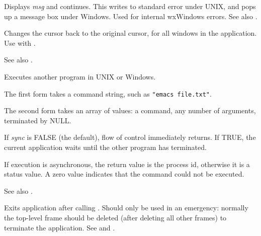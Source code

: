 \label{wxerror}


Displays {\it msg} and continues. This writes to standard error under
UNIX, and pops up a message box under Windows. Used for internal
wxWindows errors. See also .

\label{wxendbusycursor}


Changes the cursor back to the original cursor, for all windows in the application.
Use with .

See also .

\label{wxexecute}



Executes another program in UNIX or Windows.

The first form takes a command string, such as {\tt "emacs file.txt"}.

The second form takes an array of values: a command, any number of
arguments, terminated by NULL.

If {\it sync} is FALSE (the default), flow of control immediately returns.
If TRUE, the current application waits until the other program has terminated.

If execution is asynchronous, the return value is the process id,
otherwise it is a status value.  A zero value indicates that the command could not
be executed.

See also .

\label{wxexit}


Exits application after calling .
Should only be used in an emergency: normally the top-level frame
should be deleted (after deleting all other frames) to terminate the
application. See  and .

\label{wxfatalerror}

